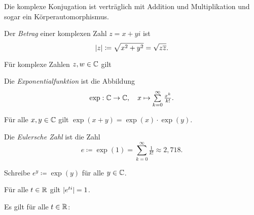 \documentclass{cheat-sheet}
\begin{document}
\begin{bem}
  Die komplexe Konjugation ist verträglich mit Addition und Multiplikation und sogar ein Körperautomorphismus.
\end{bem}

\begin{defn}
  Der \emph{Betrag} einer komplexen Zahl $z = x + yi$ ist
  \[ \lvert z\rvert \coloneqq \sqrt{x^2 + y^2} = \sqrt{z \overline{z}}. \]
\end{defn}

\begin{satz}
  Für komplexe Zahlen $z, w \in \mathbb{C}$ gilt
  \begin{itemize}
  \end{itemize}
\end{satz}


\begin{defn}
  Die \emph{Exponentialfunktion} ist die Abbildung
  \[ \exp : \C \to \C, \quad x \mapsto \sum_{k=0}^\infty \tfrac{x^k}{k!}. \]
\end{defn}

\begin{satz}
  Für alle $x, y \in \mathbb{C}$ gilt $\exp(x + y) = \exp(x) \cdot \exp(y)$.
\end{satz}

\begin{defn}
  Die \emph{Eulersche Zahl} ist die Zahl
  \[ e \coloneqq \exp(1) = \sum_{k=0}^\infty \tfrac{1}{k!} \approx 2,718. \]
\end{defn}

\begin{nota}
  Schreibe $e^y \coloneqq \exp(y)$ für alle $y \in \mathbb{C}$.
\end{nota}

\begin{prop}
  Für alle $t \in \mathbb{R}$ gilt $\lvert e^{ti}\rvert = 1$.
\end{prop}

\begin{prop}
  Es gilt für alle $t \in \mathbb{R}$:
  \begin{itemize}
  \end{itemize}
\end{prop}
\end{document}
